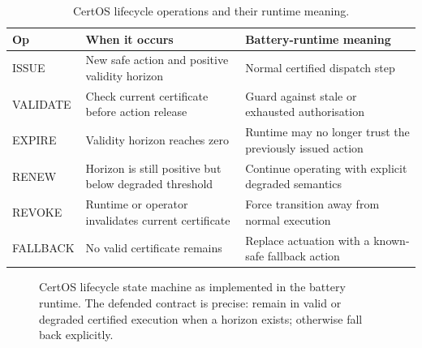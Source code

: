 \begin{table}[ht]
\centering
\caption{CertOS lifecycle operations and their runtime meaning.}
\label{tab:certos-lifecycle-ops}
\begin{tabular}{p{1.7cm}p{4.2cm}p{5.0cm}}
\toprule
\textbf{Op} & \textbf{When it occurs} & \textbf{Battery-runtime meaning} \\
\midrule
ISSUE & New safe action and positive validity horizon & Normal certified dispatch step \\
VALIDATE & Check current certificate before action release & Guard against stale or exhausted authorisation \\
EXPIRE & Validity horizon reaches zero & Runtime may no longer trust the previously issued action \\
RENEW & Horizon is still positive but below degraded threshold & Continue operating with explicit degraded semantics \\
REVOKE & Runtime or operator invalidates current certificate & Force transition away from normal execution \\
FALLBACK & No valid certificate remains & Replace actuation with a known-safe fallback action \\
\bottomrule
\end{tabular}
\end{table}

\begin{figure}[ht]
\centering
{}
\caption{CertOS lifecycle state machine as implemented in the battery runtime.
The defended contract is precise: remain in valid or degraded certified
execution when a horizon exists; otherwise fall back explicitly.}
\label{fig:certos-lifecycle}
\end{figure}

